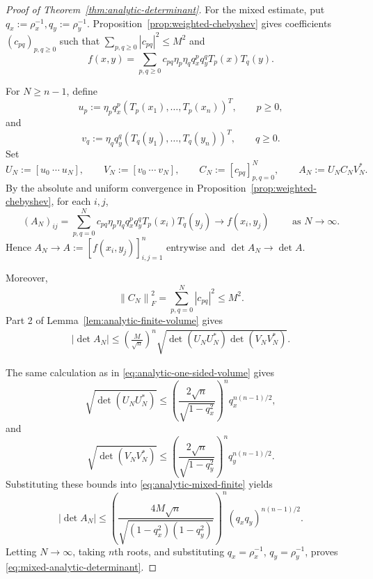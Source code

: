 \documentclass[11pt]{article}
\theoremstyle{definition}
\theoremstyle{remark}
\newcommand{\norm}[1]{\left\lVert #1\right\rVert}
\newcommand{\abs}[1]{\left\lvert #1\right\rvert}
\begin{document}
\begin{proof}[Proof of Theorem~\ref{thm:analytic-determinant}]
For the mixed estimate, put $
    q_x:=\rho_x^{-1},
    q_y:=\rho_y^{-1}.
$ 
Proposition~\ref{prop:weighted-chebyshev} gives coefficients
\((c_{pq})_{p,q\ge0}\) such that
$
    \sum_{p,q\ge0}\abs{c_{pq}}^2\le M^2
$
and
\[
    f(x,y)
    =
    \sum_{p,q\ge0}
    c_{pq}\eta_p\eta_q
    q_x^pq_y^qT_p(x)T_q(y).
\]

For \(N\ge n-1\), define
\[
    u_p
    :=
    \eta_pq_x^p
    (T_p(x_1),\ldots,T_p(x_n))^T,
    \qquad
    p\ge0,
\]
and
\[
    v_q
    :=
    \eta_qq_y^q
    (T_q(y_1),\ldots,T_q(y_n))^T,
    \qquad
    q\ge0.
\]
Set
\[
    U_N:=[u_0\ \cdots\ u_N],
    \qquad
    V_N:=[v_0\ \cdots\ v_N],
    \qquad
    C_N:=[c_{pq}]_{p,q=0}^N, 
    \qquad
    A_N:=U_NC_NV_N^*.
\]
By the absolute and uniform convergence in
Proposition~\ref{prop:weighted-chebyshev}, for each \(i,j\),
\[
    (A_N)_{ij}
    =
    \sum_{p,q=0}^N
    c_{pq}\eta_p\eta_q
    q_x^pq_y^qT_p(x_i)T_q(y_j)
    \longrightarrow
    f(x_i,y_j) \qquad
     \text{ as } N\to\infty.
\]
Hence
$
    A_N\longrightarrow
    A:=[f(x_i,y_j)]_{i,j=1}^n
$
entrywise and
$
    \det A_N\longrightarrow\det A.
$

Moreover,
\[
    \norm{C_N}_F^2
    =
    \sum_{p,q=0}^N\abs{c_{pq}}^2
    \le M^2.
\]
Part 2 of Lemma~\ref{lem:analytic-finite-volume} gives
\begin{equation}
\begin{aligned}
    \abs{\det A_N}
    \le
    \left(\frac{M}{\sqrt n}\right)^n
    \sqrt{
      \det(U_NU_N^*)\det(V_NV_N^*)
    }.
    \label{eq:analytic-mixed-finite}
\end{aligned}
\end{equation}

The same calculation as in \cref{eq:analytic-one-sided-volume} gives
\[
    \sqrt{\det(U_NU_N^*)}
    \le
    \left(
      \frac{2\sqrt n}{\sqrt{1-q_x^2}}
    \right)^n
    q_x^{n(n-1)/2},
\]
and
\[
    \sqrt{\det(V_NV_N^*)}
    \le
    \left(
      \frac{2\sqrt n}{\sqrt{1-q_y^2}}
    \right)^n
    q_y^{n(n-1)/2}.
\]
Substituting these bounds into
\eqref{eq:analytic-mixed-finite} yields
\[
    \abs{\det A_N}
    \le
    \left(
      \frac{
        4M\sqrt n
      }{
        \sqrt{(1-q_x^2)(1-q_y^2)}
      }
    \right)^n
    (q_xq_y)^{n(n-1)/2}.
\]
Letting \(N\to\infty\), taking \(n\)th roots, and substituting
\(q_x=\rho_x^{-1}\), \(q_y=\rho_y^{-1}\), proves
\eqref{eq:mixed-analytic-determinant}.
\end{proof}
\end{document}
